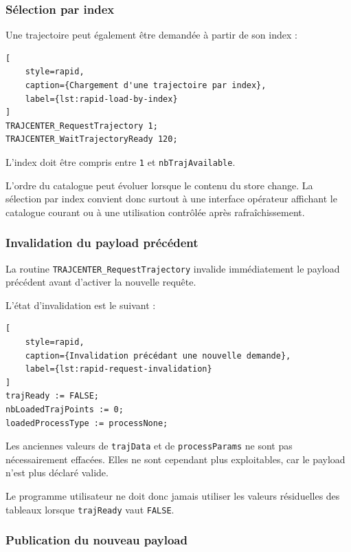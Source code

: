 \documentclass{rapportENSAM}
\begin{document}
\subsubsection{Sélection par index}
\label{subsubsec:rapid-trajectory-selection-index}

Une trajectoire peut également être demandée à partir de son index :

\begin{lstlisting}[
    style=rapid,
    caption={Chargement d'une trajectoire par index},
    label={lst:rapid-load-by-index}
]
TRAJCENTER_RequestTrajectory 1;
TRAJCENTER_WaitTrajectoryReady 120;
\end{lstlisting}

L'index doit être compris entre \texttt{1} et
\texttt{nbTrajAvailable}.

L'ordre du catalogue peut évoluer lorsque le contenu du store change. La
sélection par index convient donc surtout à une interface opérateur affichant
le catalogue courant ou à une utilisation contrôlée après rafraîchissement.


\subsubsection{Invalidation du payload précédent}
\label{subsubsec:rapid-payload-invalidation}

La routine \texttt{TRAJCENTER\_RequestTrajectory} invalide immédiatement le
payload précédent avant d'activer la nouvelle requête.

L'état d'invalidation est le suivant :

\begin{lstlisting}[
    style=rapid,
    caption={Invalidation précédant une nouvelle demande},
    label={lst:rapid-request-invalidation}
]
trajReady := FALSE;
nbLoadedTrajPoints := 0;
loadedProcessType := processNone;
\end{lstlisting}

Les anciennes valeurs de \texttt{trajData} et de
\texttt{processParams} ne sont pas nécessairement effacées. Elles ne sont
cependant plus exploitables, car le payload n'est plus déclaré valide.

Le programme utilisateur ne doit donc jamais utiliser les valeurs résiduelles
des tableaux lorsque \texttt{trajReady} vaut \texttt{FALSE}.


\subsubsection{Publication du nouveau payload}
\label{subsubsec:rapid-payload-publication}
\end{document}
